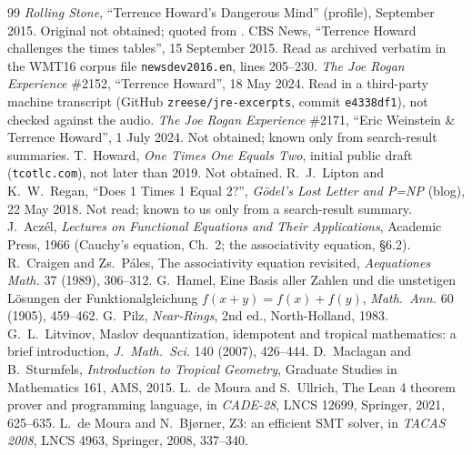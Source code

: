 \documentclass[11pt]{article}
\theoremstyle{remark}
\begin{document}
\begin{thebibliography}{99}
 \emph{Rolling Stone}, ``Terrence Howard's Dangerous Mind'' (profile), September 2015. Original not obtained; quoted from \cite{CBS15}.
 CBS News, ``Terrence Howard challenges the times tables'', 15 September 2015. Read as archived verbatim in the WMT16 corpus file \texttt{newsdev2016.en}, lines 205--230.
 \emph{The Joe Rogan Experience} \#2152, ``Terrence Howard'', 18 May 2024. Read in a third-party machine transcript (GitHub \texttt{zreese/jre-excerpts}, commit \texttt{e4338df1}), not checked against the audio.
 \emph{The Joe Rogan Experience} \#2171, ``Eric Weinstein \& Terrence Howard'', 1 July 2024. Not obtained; known only from search-result summaries.
 T.~Howard, \emph{One Times One Equals Two}, initial public draft (\texttt{tcotlc.com}), not later than 2019. Not obtained.
 R.~J.~Lipton and K.~W.~Regan, ``Does 1 Times 1 Equal 2?'', \emph{G\"odel's Lost Letter and P=NP} (blog), 22 May 2018. Not read; known to us only from a search-result summary.
 J.~Acz\'el, \emph{Lectures on Functional Equations and Their Applications}, Academic Press, 1966 (Cauchy's equation, Ch.~2; the associativity equation, \S6.2).
 R.~Craigen and Zs.~P\'ales, The associativity equation revisited, \emph{Aequationes Math.} 37 (1989), 306--312.
 G.~Hamel, Eine Basis aller Zahlen und die unstetigen L\"osungen der Funktionalgleichung $f(x+y)=f(x)+f(y)$, \emph{Math.\ Ann.} 60 (1905), 459--462.
 G.~Pilz, \emph{Near-Rings}, 2nd ed., North-Holland, 1983.
 G.~L.~Litvinov, Maslov dequantization, idempotent and tropical mathematics: a brief introduction, \emph{J.\ Math.\ Sci.} 140 (2007), 426--444.
 D.~Maclagan and B.~Sturmfels, \emph{Introduction to Tropical Geometry}, Graduate Studies in Mathematics 161, AMS, 2015.
 L.~de Moura and S.~Ullrich, The Lean 4 theorem prover and programming language, in \emph{CADE-28}, LNCS 12699, Springer, 2021, 625--635.
 L.~de Moura and N.~Bj{\o}rner, Z3: an efficient SMT solver, in \emph{TACAS 2008}, LNCS 4963, Springer, 2008, 337--340.
\end{thebibliography}
\end{document}
